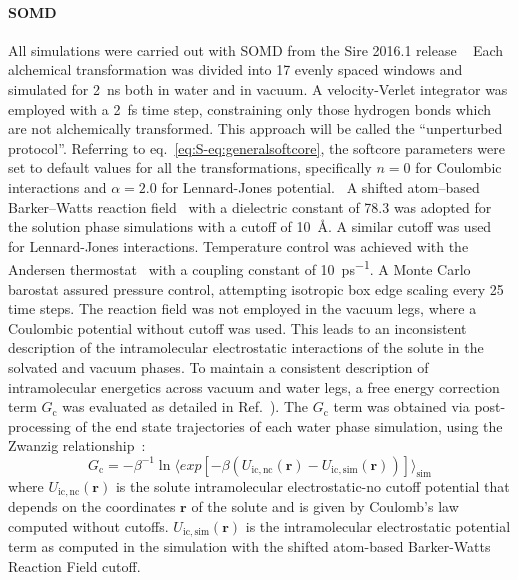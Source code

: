 \documentclass[journal=jctcce,manuscript=article]{achemso}
\begin{document}
\paragraph{SOMD} All simulations were carried out with
SOMD from the Sire 2016.1 release ~\cite{Sire-2016, doi:10.1021/ct300857j}
Each alchemical transformation was
divided into 17 evenly spaced windows and simulated for \SI{2}{ns}
both in water and in vacuum. A velocity-Verlet integrator was
employed with a \SI{2}{fs} time step, constraining only those hydrogen bonds
which are not alchemically transformed.  This approach will be called the 
``unperturbed protocol''. 
Referring to eq.~\ref{eq:S-eq:generalsoftcore}, 
the softcore parameters were set to default values for all the 
transformations, specifically $n=0$ for Coulombic interactions 
and $\alpha=2.0$ for Lennard-Jones potential.~\cite{doi:10.1021/ct700081t}
A shifted atom--based Barker--Watts reaction field~\cite{doi:10.1080/00268977300102101} with
a dielectric constant of \num{78.3} was adopted for the solution phase
simulations with a cutoff of \SI{10}{\angstrom}. A similar cutoff was used for 
Lennard-Jones interactions. Temperature control was achieved with the Andersen
thermostat~\cite{doi:10.1063/1.439486} with a coupling constant of
\SI{10}{ps^{-1}}.  A Monte Carlo barostat assured pressure control,
attempting isotropic box edge scaling every 25 time steps.
The reaction field was not employed in the vacuum legs, where a Coulombic potential without 
cutoff was used.  This leads to an inconsistent description of the 
intramolecular electrostatic interactions of the solute in the solvated and 
vacuum phases.   To maintain a consistent description of intramolecular energetics across vacuum and water legs,
a free energy correction term $G_{\mathrm{c}}$ was  evaluated as detailed in 
Ref.~).  The
$G_{\mathrm{c}}$ term was obtained via post-processing of the end state 
trajectories of each water phase simulation, using the Zwanzig 
relationship~\cite{zwanzig_high-temperature_1954}:
\begin{equation}
 \label{eq:ZwanzigDGfunc}
 G_{\mathrm{c}} = -\beta^{-1} \ln \langle exp 
 \left[-\beta(U_{\mathrm{ic,nc}}(\mathbf{r}) - 
 U_{\mathrm{ic,sim}}(\mathbf{r}))\right]\rangle_{\mathrm{sim}}
\end{equation}
where $U_{\mathrm{ic,nc}}(\mathbf{r})$ is the solute intramolecular 
electrostatic-no cutoff 
potential that depends on the coordinates $\mathbf{r}$ of the solute and is given by Coulomb's law computed without cutoffs. 
$U_{\mathrm{ic,sim}}(\mathbf{r})$ is the intramolecular electrostatic potential term as
computed in the simulation with the shifted atom-based Barker-Watts Reaction Field cutoff.
\end{document}
